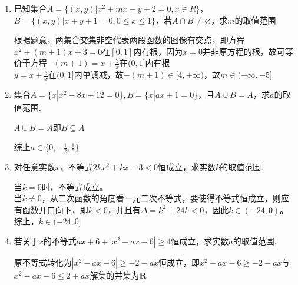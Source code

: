 \begin{enumerate}
    \item  已知集合$A=\{(x, y) | x^2+mx-y+2=0, x \in R\}$， $B=\{(x, y) | x+y+1=0, 0 \leq x \leq 1\}$，若$A \cap B \neq \varnothing$，求$m$的取值范围. 
    \begin{jieda}
        根据题意，两集合交集非空代表两段函数的图像有交点，即方程$x^2+(m+1)x+3 = 0$在$[0, 1]$内有根，因为$x = 0$并非原方程的根，故可等价于方程$-(m+1) = x + \frac{3}{x}$在$(0, 1]$内有根 \\
        $y = x + \frac{3}{x}$在$(0, 1]$内单调减，故$-(m+1) \in [4, +\infty)$，故$m \in (-\infty, -5]$
    \end{jieda}
    \begin{vspace_}
    \vsp[5]
    \end{vspace_}
    \item 集合$A = \{x | x^2-8x+12 = 0\}, B = \{x | ax+1 = 0\}$，且$A \cup B = A$，求$a$的取值范围.
    \begin{jieda}
        $A \cup B = A$即$B \subseteq A$
        综上$a \in \{0, -\frac{1}{2}, \frac{1}{6}\}$
    \end{jieda}
    \begin{vspace_}
    \vsp[5]
    \end{vspace_}
    \item 对任意实数$x$，不等式$2kx^2+kx-3<0$恒成立，求实数$k$的取值范围.
    \begin{jieda}
        当$k=0$时，不等式成立。\\
        当$k \neq 0$，从二次函数的角度看一元二次不等式，要使得不等式恒成立，则应有函数开口向下，即$k<0$，并且有$\Delta = k^2 + 24k < 0$，因此$k \in (-24, 0)$。\\
        综上，$k \in (-24, 0]$
    \end{jieda}
    \begin{vspace_}
    \vsp[5]
    \end{vspace_}
    \item 若关于$x$的不等式$ax + 6 + |x^2 - ax - 6| \geq 4$恒成立，求实数$a$的取值范围.
    \begin{jieda}
        原不等式转化为$|x^2 - ax - 6| \geq -2 - ax$恒成立，即$x^2 - ax - 6 \geq -2 - ax$与$x^2 - ax - 6 \leq 2 + ax$解集的并集为$\mathbf{R}$ \\

\end{jieda}
\end{enumerate}

